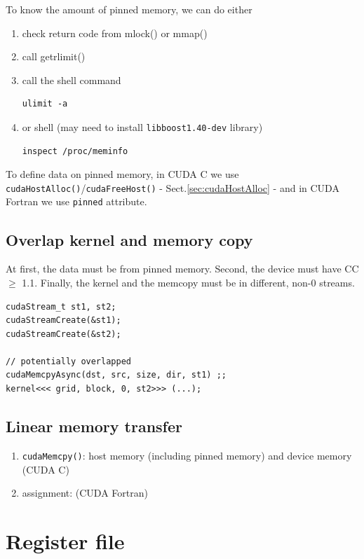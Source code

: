 To know the amount of pinned memory, we can do either
\begin{enumerate}
\item check return code from mlock() or mmap()
\item call getrlimit()
\item call the shell command
\begin{lstlisting}
ulimit -a 
\end{lstlisting}

\item or shell (may need to install \verb!libboost1.40-dev! library)
\begin{lstlisting}
inspect /proc/meminfo
\end{lstlisting}
\end{enumerate}

To define data on pinned memory, in CUDA C we use
\verb!cudaHostAlloc()!/\verb!cudaFreeHost()! - Sect.\ref{sec:cudaHostAlloc} - and in CUDA Fortran we
use \verb!pinned! attribute. 

\subsection{Overlap kernel and memory copy}
\label{sec:overl-kern-memory}

At first, the data must be from pinned memory. Second, the device must
have CC $\ge$ 1.1. Finally, the kernel and the memcopy must be in
different, non-0 streams. 

\begin{lstlisting}
cudaStream_t st1, st2;
cudaStreamCreate(&st1);
cudaStreamCreate(&st2);

// potentially overlapped
cudaMemcpyAsync(dst, src, size, dir, st1) ;;
kernel<<< grid, block, 0, st2>>> (...); 
\end{lstlisting}

\subsection{Linear memory transfer}
\label{sec:line-memory-transf}

\begin{enumerate}
\item \verb!cudaMemcpy()!: host memory (including pinned memory) and
  device memory (CUDA C)
\item assignment: (CUDA Fortran)
\end{enumerate}

\section{Register file}
\label{sec:register-memory}

